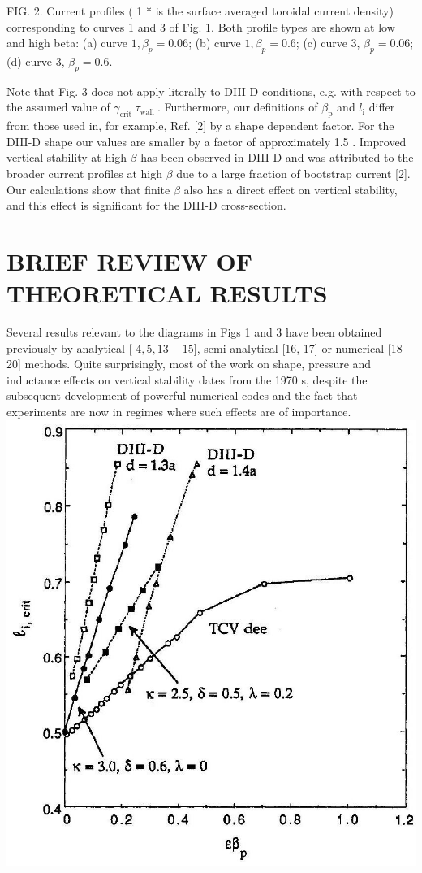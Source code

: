 \documentclass[10pt]{article}
\begin{document}
FIG. 2. Current profiles ( 1 * is the surface averaged toroidal current density) corresponding to curves 1 and 3 of Fig. 1. Both profile types are shown at low and high beta: (a) curve $1, \beta_{p}=0.06$; (b) curve $1, \beta_{p}=0.6$; (c) curve 3, $\beta_{p}=0.06$; (d) curve 3, $\beta_{p}=0.6$.

Note that Fig. 3 does not apply literally to DIII-D conditions, e.g. with respect to the assumed value of $\gamma_{\text {crit }} \tau_{\text {wall }}$. Furthermore, our definitions of $\beta_{\mathrm{p}}$ and $l_{\mathrm{i}}$ differ from those used in, for example, Ref. [2] by a shape dependent factor. For the DIII-D shape our values are smaller by a factor of approximately 1.5 . Improved vertical stability at high $\beta$ has been observed in DIII-D and was attributed to the broader current profiles at high $\beta$ due to a large fraction of bootstrap current [2]. Our calculations show that finite $\beta$ also has a direct effect on vertical stability, and this effect is significant for the DIII-D cross-section.

\section{BRIEF REVIEW OF THEORETICAL RESULTS}
Several results relevant to the diagrams in Figs 1 and 3 have been obtained previously by analytical [ $4,5,13-15]$, semi-analytical [16, 17] or numerical [18-20] methods. Quite surprisingly, most of the work on shape, pressure and inductance effects on vertical stability dates from the 1970 s, despite the subsequent development of powerful numerical codes and the fact that experiments are now in regimes where such effects are of importance.\\
\includegraphics[max width=\textwidth, center]{2025_01_10_a0135324997886412d98g-5}
\end{document}
